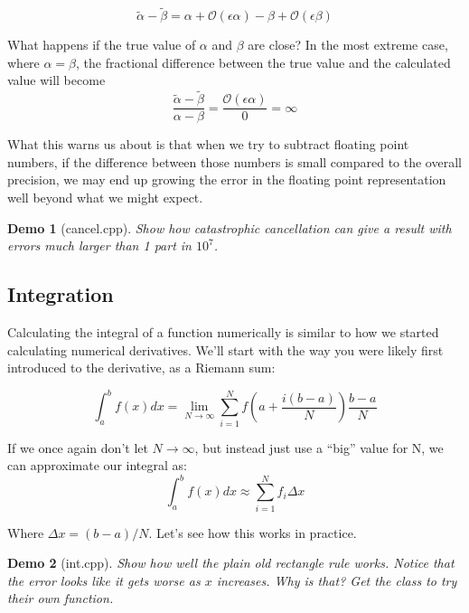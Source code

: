 \documentclass{article}
\theoremstyle{demo}
\newtheorem{demo}{Demo}[section]
\begin{document}
\begin{equation}
    \tilde \alpha - \tilde \beta = \alpha + \mathcal{O}(\epsilon \alpha) - \beta +
    \mathcal{O}(\epsilon \beta) 
\end{equation}

What happens if the true value of $\alpha$ and $\beta$ are close?  In the most
extreme case, where $\alpha = \beta$, the fractional difference between the true
value and the calculated value will become
\begin{equation}
    \frac{\tilde \alpha - \tilde \beta}{\alpha - \beta}  =
    \frac{\mathcal{O}(\epsilon \alpha)}{0} = \infty
\end{equation}

What this warns us about is that when we try to subtract floating point numbers,
if the difference between those numbers is small compared to the overall
precision, we may end up growing the error in the floating point representation
well beyond what we might expect.

\begin{demo}[cancel.cpp]
    Show how catastrophic cancellation can give a result with errors much larger
    than 1 part in $10^7$.
\end{demo}

\subsection{Integration}
Calculating the integral of a function numerically is similar to how we started
calculating numerical derivatives.  We'll start with the way you were likely
first introduced to the derivative, as a Riemann sum:

\begin{equation}
    \int_a^b f(x) dx = \lim_{N \to \infty} \sum_{i=1}^N f\left(a +
    \frac{i(b-a)}{N}\right) \frac{b-a}{N}
\end{equation}

If we once again don't let $N\rightarrow\infty$, but instead just use a ``big''
value for N, we can approximate our integral as:
\begin{equation}
    \int_a^b f(x) dx \approx \sum_{i=1}^N f_i \Delta x
\end{equation}

Where $\Delta x = (b-a)/N$.  Let's see how this works in practice.

\begin{demo}[int.cpp]
    Show how well the plain old rectangle rule works.  Notice that the error
    looks like it gets worse as $x$ increases.  Why is that?  Get the class to
    try their own function.
\end{demo}
\end{document}
